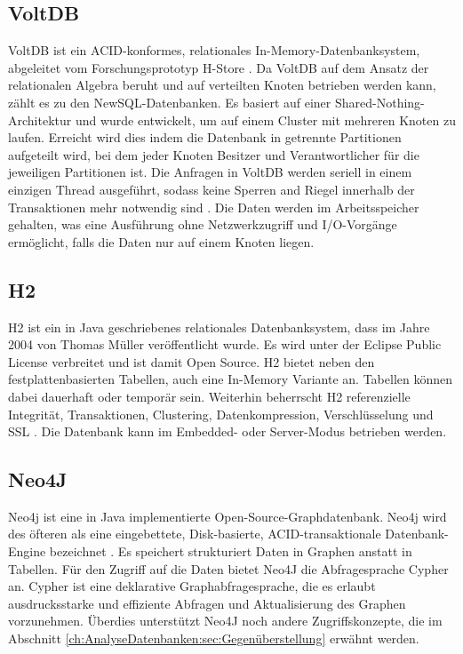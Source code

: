\subsection{VoltDB} 
\label{ch:AnalyseDatenbanken:sec:Datenbanken:subsec:VoltDB}

VoltDB \cite{volt2013a} ist ein ACID-konformes, relationales In-Memory-Datenbanksystem, abgeleitet vom Forschungsprototyp H-Store \cite{kallman08}. Da VoltDB auf dem Ansatz der relationalen Algebra beruht und auf verteilten Knoten betrieben werden kann, zählt es zu den NewSQL-Datenbanken. Es basiert auf einer Shared-Nothing-Architektur und wurde entwickelt, um auf einem Cluster mit mehreren Knoten zu laufen. Erreicht wird dies indem die Datenbank in getrennte Partitionen aufgeteilt wird, bei dem jeder Knoten Besitzer und Verantwortlicher für die jeweiligen Partitionen ist. Die Anfragen in VoltDB werden seriell in einem einzigen Thread ausgeführt, sodass keine Sperren and Riegel innerhalb der Transaktionen mehr notwendig sind \cite{volt2013b}. Die Daten werden im Arbeitsspeicher gehalten, was eine Ausführung ohne Netzwerkzugriff und I/O-Vorgänge ermöglicht, falls die Daten nur auf einem Knoten liegen.  

\subsection{H2} 
\label{ch:AnalyseDatenbanken:sec:Datenbanken:subsec:H2}

H2 ist ein in Java geschriebenes relationales Datenbanksystem, dass im Jahre 2004 von Thomas Müller veröffentlicht wurde. Es wird unter der Eclipse Public License verbreitet und ist damit Open Source. H2 bietet neben den festplattenbasierten Tabellen, auch eine In-Memory Variante an. Tabellen können dabei dauerhaft oder temporär sein. Weiterhin beherrscht H2 referenzielle Integrität, Transaktionen, Clustering, Datenkompression, Verschlüsselung und SSL \cite{h2:2013}. Die Datenbank kann im Embedded- oder Server-Modus betrieben werden.

\subsection{Neo4J} 
\label{ch:AnalyseDatenbanken:sec:Datenbanken:subsec:Neo4J}

Neo4j ist eine in Java implementierte Open-Source-Graphdatenbank. Neo4j wird des öfteren als eine eingebettete, Disk-basierte, ACID-transaktionale Datenbank-Engine bezeichnet \cite{SWB-386976589}. Es speichert strukturiert Daten in Graphen anstatt in Tabellen. Für den Zugriff auf die Daten bietet Neo4J die Abfragesprache Cypher an. Cypher ist eine deklarative Graphabfragesprache, die es erlaubt  ausdrucksstarke und effiziente Abfragen und Aktualisierung des Graphen vorzunehmen. Überdies unterstützt Neo4J noch andere Zugriffskonzepte, die im Abschnitt \ref{ch:AnalyseDatenbanken:sec:Gegenüberstellung} erwähnt werden.

